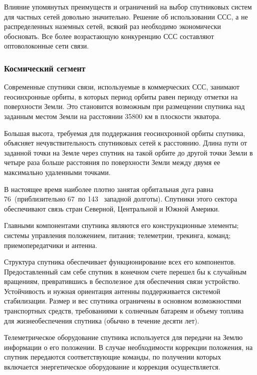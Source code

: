 \documentclass[a4paper]{report}
\begin{document}
Влияние упомянутых преимуществ и ограничений на выбор спутниковых систем для частных сетей довольно значительно. Решение об использовании ССС, а не распределенных наземных сетей, всякий раз необходимо экономически обосновать. Все более возрастающую конкуренцию ССС составляют оптоволоконные сети связи.

\subsubsection{Космический сегмент}
Современные спутники связи, используемые в коммерческих ССС, занимают геосинхронные орбиты, в которых период орбиты равен периоду отметки на поверхности Земли. Это становится возможным при размещении спутника над заданным местом Земли на расстоянии 35800 км в плоскости экватора.

Большая высота, требуемая для поддержания геосинхронной орбиты спутника, объясняет нечувствительность спутниковых сетей к расстоянию. Длина пути от заданной точки на Земле через спутник на такой орбите до другой точки Земли в четыре раза больше расстояния по поверхности Земли между двумя ее максимально удаленными точками.

В настоящее время наиболее плотно занятая орбитальная дуга равна 76\degree \  (приблизительно 67\degree \  по 143 \degree \  западной долготы). Спутники этого сектора обеспечивают связь стран Северной, Центральной и Южной Америки.

Главными компонентами спутника являются его конструкционные элементы; системы управления положением, питания; телеметрии, трекинга, команд; приемопередатчики и антенна.

Структура спутника обеспечивает функционирование всех его компонентов. Предоставленный сам себе спутник в конечном счете перешел бы к случайным вращениям, превратившись в бесполезное для обеспечения связи устройство. Устойчивость и нужная ориентация антенны поддерживается системой стабилизации. Размер и вес спутника ограничены в основном возможностями транспортных средств, требованиями к солнечным батареям и объему топлива для жизнеобеспечения спутника (обычно в течение десяти лет).

Телеметрическое оборудование спутника используется для передачи на Землю информации о его положении. В случае необходимости коррекции положения, на спутник передаются соответствующие команды, по получении которых включается энергетическое оборудование и коррекция осуществляется.

~
\end{document}
